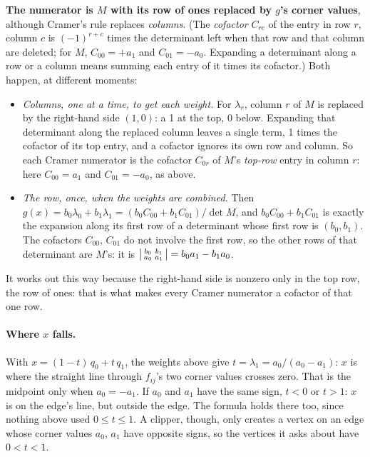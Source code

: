 \documentclass[11pt,a4paper]{article}
\theoremstyle{remark}
\begin{document}
\textbf{The numerator is $M$ with its row of ones replaced by $g$'s corner values}, although
Cramer's rule replaces \emph{columns}. (The \emph{cofactor} $C_{rc}$ of the entry in row $r$,
column $c$ is $(-1)^{r+c}$ times the determinant left when that row and that column are deleted;
for $M$, $C_{00} = +a_1$ and $C_{01} = -a_0$. Expanding a determinant along a row or a column
means summing each entry of it times its cofactor.) Both happen, at different moments:
\begin{itemize}
  \item \emph{Columns, one at a time, to get each weight.} For $\lambda_r$, column $r$ of $M$ is
    replaced by the right-hand side $(1, 0)$: a 1 at the top, 0 below. Expanding that determinant
    along the replaced column leaves a single term, 1 times the cofactor of its top entry, and a
    cofactor ignores its own row and column. So each Cramer numerator is the cofactor $C_{0r}$ of
    $M$'s \emph{top-row} entry in column $r$: here $C_{00} = a_1$ and $C_{01} = -a_0$, as above.
  \item \emph{The row, once, when the weights are combined.} Then
    $g(x) = b_0\lambda_0 + b_1\lambda_1 = (b_0 C_{00} + b_1 C_{01})/\det M$, and
    $b_0 C_{00} + b_1 C_{01}$ is exactly the expansion along its first row of a determinant whose
    first row is $(b_0, b_1)$. The cofactors $C_{00}$, $C_{01}$ do not involve the first row, so
    the other rows of that determinant are $M$'s: it is $\begin{vsmallmatrix} b_0 & b_1\\ a_0 & a_1
    \end{vsmallmatrix} = b_0a_1 - b_1a_0$.
\end{itemize}
It works out this way because the right-hand side is nonzero only in the top row, the row of
ones: that is what makes every Cramer numerator a cofactor of that one row.

\paragraph{Where $x$ falls.} With $x = (1-t)\,q_0 + t\,q_1$, the weights above give
$t = \lambda_1 = a_0/(a_0 - a_1)$: $x$ is where the straight line through $f_{ij}$'s two corner
values crosses zero. That is the midpoint only when $a_0 = -a_1$. If $a_0$ and $a_1$ have the same
sign, $t < 0$ or $t > 1$: $x$ is on the edge's line, but outside the edge. The formula holds there
too, since nothing above used $0 \le t \le 1$. A clipper, though, only creates a vertex on an edge
whose corner values $a_0$, $a_1$ have opposite signs, so the vertices it asks about have
$0 < t < 1$.
\end{document}
